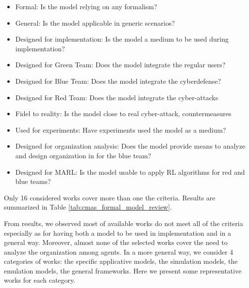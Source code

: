 \documentclass[conference]{IEEEtran}
\begin{document}
\begin{itemize}
    \item Formal: Is the model relying on any formalism?
    \item General: Is the model applicable in generic scenarios?
    \item Designed for implementation: Is the model a medium to be used during implementation?
    \item Designed for Green Team: Does the model integrate the regular users?
    \item Designed for Blue Team: Does the model integrate the cyberdefense?
    \item Designed for Red Team: Does the model integrate the cyber-attacks
    \item Fidel to reality: Is the model close to real cyber-attack, countermeasures
    \item Used for experiments: Have experiments used the model as a medium?
    \item Designed for organization analysis: Does the model provide means to analyze and design organization in for the blue team?
    \item Designed for MARL: Is the model usable to apply RL algorithms for red and blue teams?
\end{itemize}

Only 16 considered works cover more than one the criteria. Results are summarized in Table \ref{tab:cmas_formal_model_review}.

From results, we observed most of available works do not meet all of the criteria especially as for having both a model to be used in implementation and in a general way. Moreover, almost none of the selected works cover the need to analyze the organization among agents. In a more general way, we consider 4 categories of works: the specific applicative models, the simulation models, the emulation models, the general frameworks. Here we present some representative works for each category.


\end{document}
